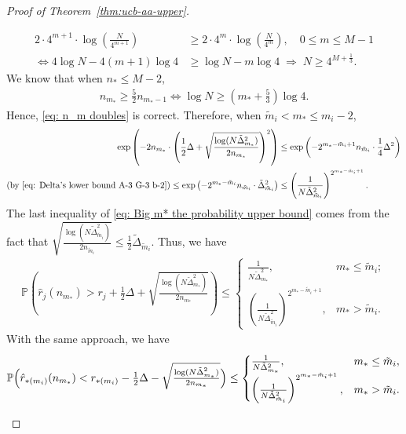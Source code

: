 \documentclass[
  12pt]{article}
\begin{document}
\begin{proof}[Proof of Theorem~\ref{thm:ucb-aa-upper}]
\begin{itemize}
\begin{align*}
    2\cdot 4^{m+1}\cdot \log\left(\frac{N}{4^{m+1}}\right)&\geq 2\cdot 4^{m}\cdot \log\left(\frac{N}{4^{m}}\right),\quad 0\leq m\leq M-1\\
    \iff 4\log N -4(m+1)\log 4&\geq \log N - m\log 4 \; \Rightarrow\; N\geq 4^{M+\frac{1}{3}}.
\end{align*}
We know that when $n_*\leq M-2$,
\begin{align*}
    n_{m_*}\geq \frac{5}{2}n_{m_*-1}\iff  \log N \geq \left(m_*+\frac{5}{3}\right)\log 4.
\end{align*}
Hence, \eqref{eq: n_m doubles} is correct. Therefore, when $\tilde{m}_i<m_*\leq m_i-2$, 
\begin{align}
    \exp \left(-2n_{m_*}\cdot \left(\frac{1}{2}\Delta +\sqrt{\frac{\log(N \tilde{\Delta}_{m_*}^2)}{2n_{m_*}}}\right)^2\right)&\leq \exp \left(-2^{m_*-\tilde{m}_i+1}n_{\tilde{m}_i}\cdot \frac{1}{4}\Delta ^2\right)\notag \\
    (\text{by } \eqref{eq: Delta's lower bound A-3 G-3 b-2})
    \leq \exp \left(-2^{m_*-\tilde{m}_i}n_{\tilde{m}_i}\cdot \tilde{\Delta}_{\tilde{m}_i}^2\right)&\leq \left(\frac{1}{N\tilde{\Delta}_{\tilde{m}_i}^2}\right)^{2^{m_*-\tilde{m}_i+1}}.
    \label{eq: Big m* the probability upper bound}
\end{align}
The last inequality of \eqref{eq: Big m* the probability upper bound} comes from the fact that $\sqrt{\frac{\log(N \tilde{\Delta}_{\tilde{m}_i}^2)}{2n_{\tilde{m}_i}}}\leq \frac{1}{2}\tilde{\Delta}_{\tilde{m}_i}$. Thus, we have
\begin{align}
\!\!\!\!\!\!\!\!\!\!\!\!\mathbb{P}\left(\hat{r}_j(n_{m_*}) > r_j +\frac{1}{2}\Delta +\sqrt{\frac{\log(N \tilde{\Delta}_{m_*}^2)}{2n_{m_*}}}\right)\leq 
\begin{cases}
    \frac{1}{N\tilde{\Delta}_{m_*}^2}, & m_* \leq \tilde{m}_i;\\
    \left(\frac{1}{N\tilde{\Delta}_{\tilde{m}_i}^2}\right)^{2^{m_*-\tilde{m}_i+1}}, & m_*>\tilde{m}_i.
\end{cases}
\label{eq: A-3 G-3 b2 concentration bound 1}
\end{align}
With the same approach, we have 
\begin{align}
\mathbb{P}\Bigl(\hat{r}_{*(m_i)}(n_{m_*}) < r_{*(m_i)} - \tfrac{1}{2}\Delta - \sqrt{\tfrac{\log(N\tilde{\Delta}_{m_*}^2)}{2n_{m_*}}}\Bigr)
\le
\begin{cases}
    \frac{1}{N\tilde{\Delta}_{m_*}^2}, & m_* \le \tilde{m}_i,\\
    \left(\frac{1}{N\tilde{\Delta}_{\tilde{m}_i}^2}\right)^{2^{m_* - \tilde{m}_i + 1}}, & m_* > \tilde{m}_i.

\end{cases}
\end{align}
\end{itemize}
\end{proof}
\end{document}
